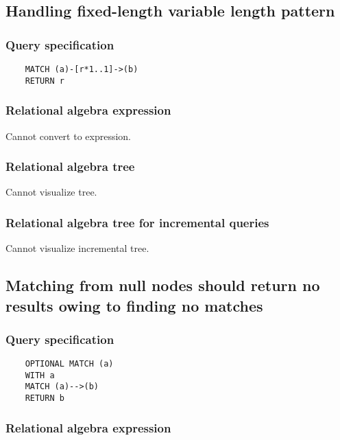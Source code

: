 	\subsection{Handling fixed-length variable length pattern}

	\subsubsection*{Query specification}

	\begin{lstlisting}
	MATCH (a)-[r*1..1]->(b)
	RETURN r
	\end{lstlisting}


	\subsubsection*{Relational algebra expression}

	Cannot convert to expression.

	\subsubsection*{Relational algebra tree}

	Cannot visualize tree.

	\subsubsection*{Relational algebra tree for incremental queries}

	Cannot visualize incremental tree.
	\subsection{Matching from null nodes should return no results owing to finding no matches}

	\subsubsection*{Query specification}

	\begin{lstlisting}
	OPTIONAL MATCH (a)
	WITH a
	MATCH (a)-->(b)
	RETURN b
	\end{lstlisting}


	\subsubsection*{Relational algebra expression}

